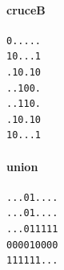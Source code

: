 \par\vspace{8pt}
\noindent\begin{minipage}[t]{\columnwidth}
\paragraph{cruceB}
\begin{verbatim}
0.....
10...1
.10.10
..100.
..110.
.10.10
10...1
\end{verbatim}
\end{minipage}
\par\vspace{8pt}
\noindent\begin{minipage}[t]{\columnwidth}
\paragraph{union}
\begin{verbatim}
...01....
...01....
...011111
000010000
111111...
\end{verbatim}
\end{minipage}
\par\vspace{8pt}
